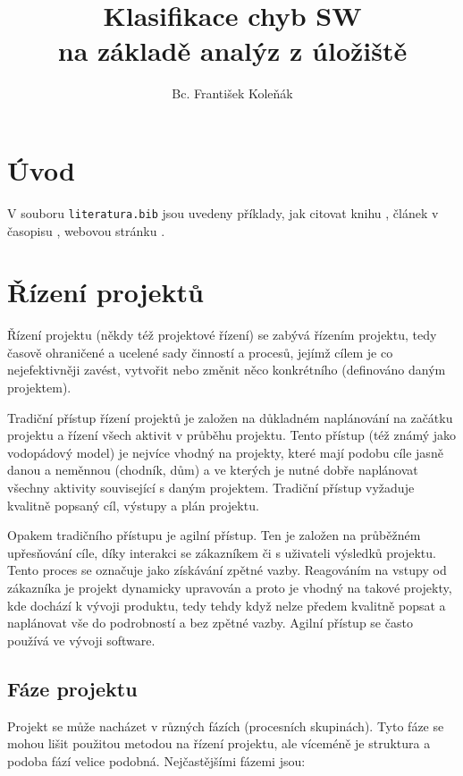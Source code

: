 \documentclass[czech,DP]{thesiskiv}
\author{Bc. František Koleňák}
\title{Klasifikace chyb SW \\na základě analýz z úložiště}
\begin{document}
%
\maketitle
\tableofcontents

\chapter{Úvod}
V souboru \texttt{literatura.bib} jsou uvedeny příklady, jak citovat knihu \cite{KnuthAOCP2}, článek v časopisu \cite{Hoare1961}, webovou stránku \cite{Graphics2D}.
 
\newpage

\chapter{Řízení projektů}
Řízení projektu (někdy též projektové řízení) se zabývá řízením projektu, tedy časově ohraničené a ucelené sady činností a procesů, jejímž cílem je co nejefektivněji zavést, vytvořit nebo změnit něco konkrétního (definováno daným projektem).

Tradiční přístup řízení projektů je založen na důkladném naplánování na začátku projektu a řízení všech aktivit v průběhu projektu. Tento přístup (též známý jako vodopádový model) je nejvíce vhodný na projekty, které mají podobu cíle jasně danou a neměnnou (chodník, dům) a ve kterých je nutné dobře naplánovat všechny aktivity související s daným projektem. Tradiční přístup vyžaduje kvalitně popsaný cíl, výstupy a plán projektu.

Opakem tradičního přístupu je agilní přístup. Ten je založen na průběžném upřesňování cíle, díky interakci se zákazníkem či s uživateli výsledků projektu. Tento proces se označuje jako získávání zpětné vazby. Reagováním na vstupy od zákazníka je projekt dynamicky upravován a proto je vhodný na takové projekty, kde dochází k vývoji produktu, tedy tehdy když nelze předem kvalitně popsat a naplánovat vše do podrobností a bez zpětné vazby. Agilní přístup se často používá ve vývoji software.

\section{Fáze projektu}
Projekt se může nacházet v různých fázích (procesních skupinách). Tyto fáze se mohou lišit použitou metodou na řízení projektu, ale víceméně je struktura a podoba fází velice podobná. Nejčastějšími fázemi jsou:
\end{document}
